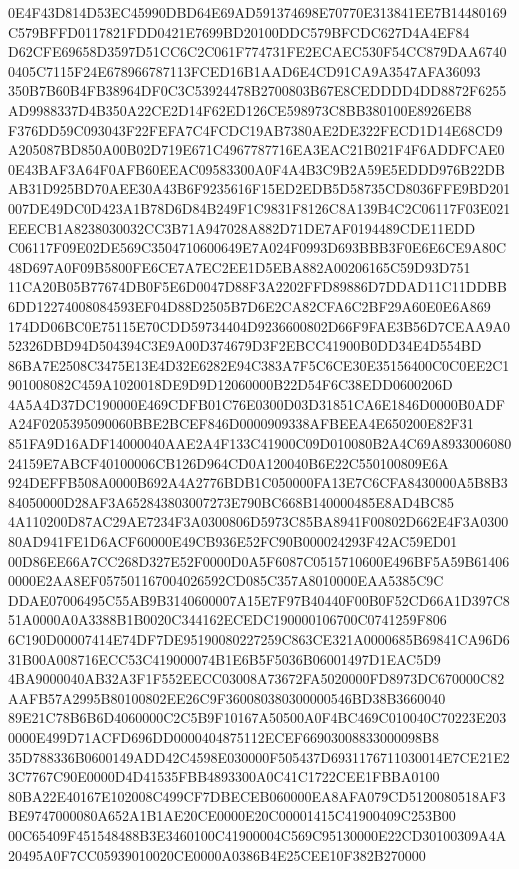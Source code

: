 \documentclass[UTF8,fontset=fandol,zihao=-4,a4paper]{ctexart}
\begin{document}
{{0E4F43D814D53EC45990DBD64E69AD591374698E70770E313841EE7B14480169C579BFFD0117821FDD0421E7699BD20100DDC579BFCDC627D4A4EF84
D62CFE69658D3597D51CC6C2C061F774731FE2ECAEC530F54CC879DAA67400405C7115F24E678966787113FCED16B1AAD6E4CD91CA9A3547AFA36093
350B7B60B4FB38964DF0C3C53924478B2700803B67E8CEDDDD4DD8872F6255AD9988337D4B350A22CE2D14F62ED126CE598973C8BB380100E8926EB8
F376DD59C093043F22FEFA7C4FCDC19AB7380AE2DE322FECD1D14E68CD9A205087BD850A00B02D719E671C4967787716EA3EAC21B021F4F6ADDFCAE0
0E43BAF3A64F0AFB60EEAC09583300A0F4A4B3C9B2A59E5EDDD976B22DBAB31D925BD70AEE30A43B6F9235616F15ED2EDB5D58735CD8036FFE9BD201
007DE49DC0D423A1B78D6D84B249F1C9831F8126C8A139B4C2C06117F03E021EEECB1A8238030032CC3B71A947028A882D71DE7AF0194489CDE11EDD
C06117F09E02DE569C3504710600649E7A024F0993D693BBB3F0E6E6CE9A80C48D697A0F09B5800FE6CE7A7EC2EE1D5EBA882A00206165C59D93D751
11CA20B05B77674DB0F5E6D0047D88F3A2202FFD89886D7DDAD11C11DDBB6DD12274008084593EF04D88D2505B7D6E2CA82CFA6C2BF29A60E0E6A869
174DD06BC0E75115E70CDD59734404D9236600802D66F9FAE3B56D7CEAA9A052326DBD94D504394C3E9A00D374679D3F2EBCC41900B0DD34E4D554BD
86BA7E2508C3475E13E4D32E6282E94C383A7F5C6CE30E35156400C0C0EE2C1901008082C459A1020018DE9D9D12060000B22D54F6C38EDD0600206D
4A5A4D37DC190000E469CDFB01C76E0300D03D31851CA6E1846D0000B0ADFA24F0205395090060BBE2BCEF846D0000909338AFBEEA4E650200E82F31
851FA9D16ADF14000040AAE2A4F133C41900C09D010080B2A4C69A893300608024159E7ABCF40100006CB126D964CD0A120040B6E22C550100809E6A
924DEFFB508A0000B692A4A2776BDB1C050000FA13E7C6CFA8430000A5B8B384050000D28AF3A652843803007273E790BC668B140000485E8AD4BC85
4A110200D87AC29AE7234F3A0300806D5973C85BA8941F00802D662E4F3A030080AD941FE1D6ACF60000E49CB936E52FC90B000024293F42AC59ED01
00D86EE66A7CC268D327E52F0000D0A5F6087C0515710600E496BF5A59B614060000E2AA8EF057501167004026592CD085C357A8010000EAA5385C9C
DDAE07006495C55AB9B3140600007A15E7F97B40440F00B0F52CD66A1D397C851A0000A0A3388B1B0020C344162ECEDC190000106700C0741259F806
6C190D00007414E74DF7DE95190080227259C863CE321A0000685B69841CA96D631B00A008716ECC53C419000074B1E6B5F5036B06001497D1EAC5D9
4BA9000040AB32A3F1F552EECC03008A73672FA5020000FD8973DC670000C82AAFB57A2995B80100802EE26C9F360080380300000546BD38B3660040
89E21C78B6B6D4060000C2C5B9F10167A50500A0F4BC469C010040C70223E2030000E499D71ACFD696DD0000404875112ECEF66903008833000098B8
35D788336B0600149ADD42C4598E030000F505437D6931176711030014E7CE21E23C7767C90E0000D4D41535FBB4893300A0C41C1722CEE1FBBA0100
80BA22E40167E102008C499CF7DBECEB060000EA8AFA079CD5120080518AF3BE9747000080A652A1B1AE20CE0000E20C00001415C41900409C253B00
00C65409F451548488B3E3460100C41900004C569C95130000E22CD30100309A4A20495A0F7CC05939010020CE0000A0386B4E25CEE10F382B270000
}}
\end{document}
